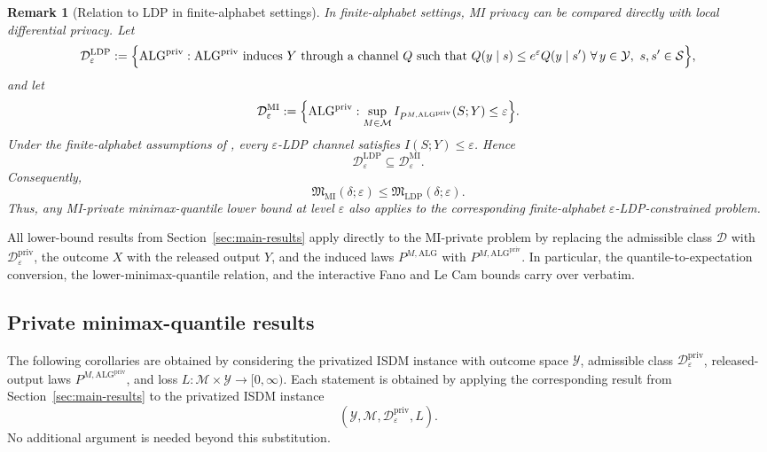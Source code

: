 \documentclass[journal]{IEEEtran}
\newtheorem{remark}{Remark}
\newcommand{\ALG}{\mathrm{ALG}}
\begin{document}
\begin{remark}[Relation to LDP in finite-alphabet settings]
In finite-alphabet settings, MI privacy can be compared directly with local
differential privacy. Let
\[
\mathcal D_{\varepsilon}^{\mathrm{LDP}}
:=
\Bigl\{
\ALG^{\mathrm{priv}}:
\ALG^{\mathrm{priv}} \text{ induces } Y \text{ through a channel } Q
\text{ such that }
Q(y\mid s)\le e^\varepsilon Q(y\mid s')
\ \forall\, y\in\mathcal Y,\ s,s'\in\mathcal S
\Bigr\},
\]
and let
\[
\mathcal D_{\varepsilon}^{\mathrm{MI}}
:=
\Bigl\{
\ALG^{\mathrm{priv}}:
\sup_{M\in\mathcal M}
I_{P^{M,\ALG^{\mathrm{priv}}}}(S;Y)
\le \varepsilon
\Bigr\}.
\]
Under the finite-alphabet assumptions of
\cite[Lemma~1]{lopuhaa2020privacy}, every \(\varepsilon\)-LDP channel satisfies
\(I(S;Y)\le\varepsilon\). Hence
\[
\mathcal D_{\varepsilon}^{\mathrm{LDP}}
\subseteq
\mathcal D_{\varepsilon}^{\mathrm{MI}}.
\]
Consequently,
\[
\mathfrak M_{\mathrm{MI}}(\delta;\varepsilon)
\le
\mathfrak M_{\mathrm{LDP}}(\delta;\varepsilon).
\]
Thus, any MI-private minimax-quantile lower bound at level \(\varepsilon\)
also applies to the corresponding finite-alphabet
\(\varepsilon\)-LDP-constrained problem.
\end{remark}

All lower-bound results from Section~\ref{sec:main-results}
apply directly to the MI-private problem by replacing the admissible class
\(\mathcal D\) with \(\mathcal D_\varepsilon^{\mathrm{priv}}\), the outcome
\(X\) with the released output \(Y\), and the induced laws \(P^{M,\ALG}\) with
\(P^{M,\ALG^{\mathrm{priv}}}\). In particular, the quantile-to-expectation conversion, the
lower-minimax-quantile relation, and the interactive Fano and Le Cam bounds
carry over verbatim. 

\subsection{Private minimax-quantile results}

 The following corollaries are obtained by considering the privatized
ISDM instance with outcome space \(\mathcal Y\), admissible class
\(\mathcal D_\varepsilon^{\mathrm{priv}}\), released-output laws
\(P^{M,\ALG^{\mathrm{priv}}}\), and loss \(L:\mathcal M\times\mathcal Y
\to[0,\infty)\). Each statement is obtained by applying the corresponding result from
Section~\ref{sec:main-results} to the privatized ISDM instance
\[
(\mathcal Y,\mathcal M,\mathcal D_\varepsilon^{\mathrm{priv}},L).
\] No additional argument is
needed beyond this substitution.
\end{document}
